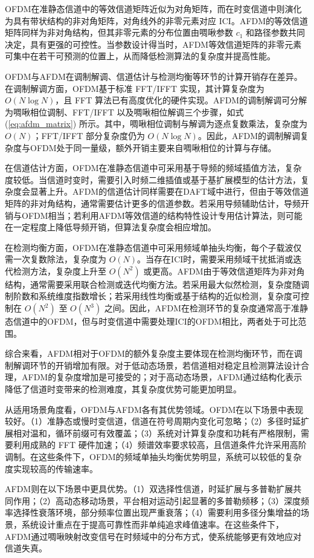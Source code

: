 OFDM在准静态信道中的等效信道矩阵近似为对角矩阵，而在时变信道中则演化为具有带状结构的非对角矩阵，对角线外的非零元素对应 ICI。AFDM的等效信道矩阵同样为非对角结构，但其非零元素的分布位置由啁啾参数 $c_1$ 和路径参数共同决定，具有更强的可控性。当参数设计得当时，AFDM等效信道矩阵的非零元素可集中在若干可预测的位置上，从而降低检测算法的复杂度并提高性能。


OFDM与AFDM在调制解调、信道估计与检测均衡等环节的计算开销存在差异。在调制解调方面，OFDM基于标准 FFT/IFFT 实现，其计算复杂度为 $O(N\log N)$，且 FFT 算法已有高度优化的硬件实现。AFDM的调制解调可分解为啁啾相位调制、FFT/IFFT 以及啁啾相位解调三个步骤，如式(\ref{eq:afdm_matrix}) 所示。其中，啁啾相位调制与解调为逐点复数乘法，复杂度为 $O(N)$；FFT/IFFT 部分复杂度仍为 $O(N\log N)$。因此，AFDM的调制解调复杂度与OFDM处于同一量级，额外开销主要来自啁啾相位的计算与存储。

在信道估计方面，OFDM在准静态信道中可采用基于导频的频域插值方法，复杂度较低。当信道时变时，需要引入时频二维插值或基于基扩展模型的估计方法，复杂度会显著上升。AFDM的信道估计同样需要在DAFT域中进行，但由于等效信道矩阵的非对角结构，通常需要估计更多的信道参数。若采用导频辅助估计，导频开销与OFDM相当；若利用AFDM等效信道的结构特性设计专用估计算法，则可能在一定程度上降低导频开销，但算法复杂度会相应增加。

在检测均衡方面，OFDM在准静态信道中可采用频域单抽头均衡，每个子载波仅需一次复数除法，复杂度为 $O(N)$。当存在ICI时，需要采用频域干扰抵消或迭代检测方法，复杂度上升至 $O(N^2)$ 或更高。AFDM由于等效信道矩阵为非对角结构，通常需要采用联合检测或迭代均衡方法。若采用最大似然检测，复杂度随调制阶数和系统维度指数增长；若采用线性均衡或基于结构的近似检测，复杂度可控制在 $O(N^2)$ 至 $O(N^3)$ 之间。因此，AFDM在检测环节的复杂度通常高于准静态信道中的OFDM，但与时变信道中需要处理ICI的OFDM相比，两者处于可比范围。

综合来看，AFDM相对于OFDM的额外复杂度主要体现在检测均衡环节，而在调制解调环节的开销增加有限。对于低动态场景，若信道相对稳定且检测算法设计合理，AFDM的复杂度增加是可接受的；对于高动态场景，AFDM通过结构化表示降低了信道时变带来的检测难度，其复杂度优势可能更加明显。


从适用场景角度看，OFDM与AFDM各有其优势领域。OFDM在以下场景中表现较好。（1）准静态或慢时变信道，信道在符号周期内变化可忽略；（2）多径时延扩展相对温和，循环前缀可有效覆盖；（3）系统对计算复杂度和功耗有严格限制，需要利用成熟的 FFT 硬件加速；（4）频谱效率要求较高，且信道条件允许采用高阶调制。在这些条件下，OFDM的频域单抽头均衡优势明显，系统可以较低的复杂度实现较高的传输速率。

AFDM则在以下场景中更具优势。（1）双选择性信道，时延扩展与多普勒扩展共同作用；（2）高动态移动场景，平台相对运动引起显著的多普勒频移；（3）深度频率选择性衰落环境，部分频率位置出现严重衰落；（4）需要利用多径分集增益的场景，系统设计重点在于提高可靠性而非单纯追求峰值速率。在这些条件下，AFDM通过啁啾映射改变信号在时频域中的分布方式，使系统能够更有效地应对信道失真。

